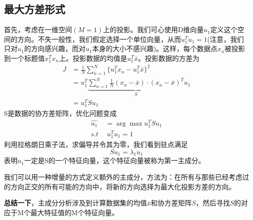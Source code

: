 \subsection*{最大方差形式}
首先，考虑在一维空间$(M=1)$上的投影。我们可心使用D维向量$u_1$定义这个空间的方向。不失一般性，我们假定选择一个单位向量，从而$u_1^Tu_1=1$(注意，我们只对$u_1$的方向感兴趣，而对$u_1$本身的大小不感兴趣)。这样，每个数据点$x_n$被投影到一个标题值$x_1^Tx_n$上。投影数据的均值是$u_1^T\bar{x}$。投影数据的方差为
\begin{equation}
\begin{aligned}
	J&=\frac{1}{N}\sum_{n=1}^{N}\{u_1^Tx_n-u_1^T\bar{x}\}^2\\
	&=u_1^T\underbrace{\sum_{n=1}^{N}\frac{1}{N}(x_n-\bar{x})\cdot(x_n-\bar{x})^T}_Su_1\\
	&=u_1^TSu_1
\end{aligned}	
\end{equation}
S是数据的协方差矩阵，优化问题变成
\begin{equation}
	\begin{aligned}
		\hat{u_1}&=\arg \max u_1^TSu_1\\
		s.t\ &\ u_1^Tu_1=1
	\end{aligned}
\end{equation}
利用拉格朗日乘子法，求偏导并令其为零，我们看到驻点满足
\begin{equation}
	Su_1=\lambda_1u_1
\end{equation}
表明$u_1$一定是S的一个特征向量，这个特征向量被称为第一主成分。

我们可以用一种增量的方式定义额外的主成分，方法为：在所有与那些已经考虑过的方向正交的所有可能的方向中，将新的方向选择为最大化投影方差的方向。

\textbf{总结一下}，主成分分析涉及到计算数据集的均值$\bar{x}$和协方差矩阵$S$，然后寻找$S$的对应于M个最大特征值的M个特征向量。
